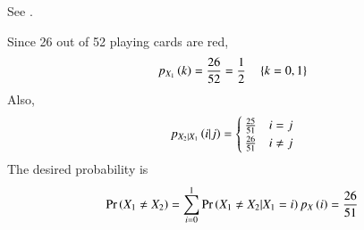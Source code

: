 See 
        .
\begin{table}[H]
        \centering
        
        \caption{}
        \label{tab:ncert/11/16/3/20/}
\end{table}
Since 26 out of 52 playing cards are red, 
\begin{align}
         p_{X_1}\left(k\right) = \frac{26}{52}= \frac{1}{2} \quad \left\{k=0,1\right\}
\end{align} 
Also, 
\begin{align}
	p_{X_2|X_1}\left(i|j\right) 
			= 
			\begin{cases}
				\frac{25}{51} & i = j \\
                         \frac{26}{51}& i \ne j \\
			\end{cases}
\end{align}
The desired probability is
\begin{align}
\Pr\left(X_1 \ne X_2\right)= \sum_{i=0}^{1}\Pr\left(X_1 \ne X_2|X_1=i\right)p_{X}\left(i\right)
                           =\frac{26}{51}
\end{align}
